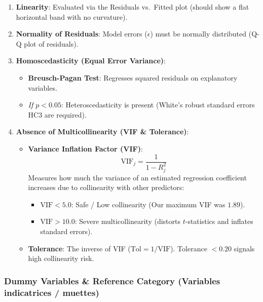 \documentclass[
]{article}
\providecommand{\tightlist}{%
  \setlength{\itemsep}{0pt}\setlength{\parskip}{0pt}}
\begin{document}
\begin{enumerate}
\def\labelenumi{\arabic{enumi}.}
\tightlist
\item
  \textbf{Linearity}: Evaluated via the Residuals vs.~Fitted plot
  (should show a flat horizontal band with no curvature).
\item
  \textbf{Normality of Residuals}: Model errors (\(\epsilon\)) must be
  normally distributed (Q-Q plot of residuals).
\item
  \textbf{Homoscedasticity (Equal Error Variance)}:

  \begin{itemize}
  \tightlist
  \item
    \textbf{Breusch-Pagan Test}: Regresses squared residuals on
    explanatory variables.
  \item
    \emph{If \(p < 0.05\)}: Heteroscedasticity is present (White's
    robust standard errors HC3 are required).
  \end{itemize}
\item
  \textbf{Absence of Multicollinearity (VIF \& Tolerance)}:

  \begin{itemize}
  \tightlist
  \item
    \textbf{Variance Inflation Factor (VIF)}:
    \[\text{VIF}_j = \frac{1}{1 - R_j^2}\] Measures how much the
    variance of an estimated regression coefficient increases due to
    collinearity with other predictors:

    \begin{itemize}
    \tightlist
    \item
      \(\text{VIF} < 5.0\): Safe / Low collinearity (Our maximum VIF was
      \(1.89\)).
    \item
      \(\text{VIF} > 10.0\): Severe multicollinearity (distorts
      \(t\)-statistics and inflates standard errors).
    \end{itemize}
  \item
    \textbf{Tolerance}: The inverse of VIF
    (\(\text{Tol} = 1 / \text{VIF}\)). Tolerance \(< 0.20\) signals high
    collinearity risk.
  \end{itemize}
\end{enumerate}

\subsubsection{Dummy Variables \& Reference Category (Variables
indicatrices /
muettes)}\label{dummy-variables-reference-category-variables-indicatrices-muettes}
\end{document}
